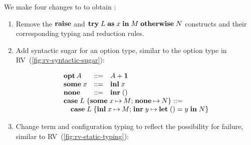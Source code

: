\documentclass[sigplan,screen,review]{acmart}
\begin{document}
We make four changes to \affineEGV to obtain \affineAGV:
\begin{enumerate}
\item
  Remove the $\gvRaise$ and $\gvTry{L}{x}{M}{N}$ constructs and their corresponding typing and reduction rules.
\item
  Add syntactic sugar for an option type, similar to the option type in RV~(\cref{fig:rv-syntactic-sugar}):
  \\
  \begin{minipage}{1.0\linewidth}
    \[%
      \begin{array}{l}%
        \!\!\!%
        \begin{array}{lcl}%
          \gvTyOpt{A} &::=& \gvTySum{A}{\gvTyUnit}
          \\
          \gvSome{x} &::=& \gvInl{x}
          \\
          \gvNone &::=& \gvInr{\gvUnit}
        \end{array}
        \\
        \gvCaseOpt{L}{x}{M}{N} ::=
        \\
        \quad\gvCaseSum{L}{x}{M}{y}{\gvLetUnit{y}{N}}
      \end{array}
    \]
  \end{minipage}
\item
  Change term and configuration typing to reflect the possibility for failure, similar to RV~(\cref{fig:rv-static-typing}):
  \begin{center}
    \begin{prooftree}
    \end{prooftree}    
    \begin{prooftree}
    \end{prooftree}
    \begin{prooftree}
    \end{prooftree}
    \begin{prooftree*}

\end{prooftree*}
\end{center}
\end{enumerate}
\end{document}
